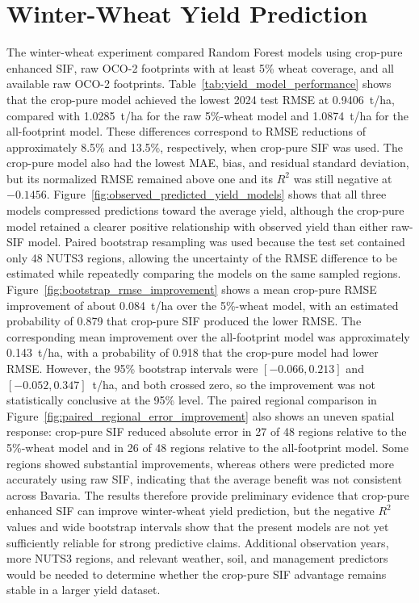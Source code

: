 \section{Winter-Wheat Yield Prediction}
The winter-wheat experiment compared Random Forest models using crop-pure enhanced SIF, raw OCO-2 footprints with at least 5\% wheat coverage, and all available raw OCO-2 footprints. Table~\ref{tab:yield_model_performance} shows that the crop-pure model achieved the lowest 2024 test RMSE at 0.9406~t/ha, compared with 1.0285~t/ha for the raw 5\%-wheat model and 1.0874~t/ha for the all-footprint model. These differences correspond to RMSE reductions of approximately 8.5\% and 13.5\%, respectively, when crop-pure SIF was used. The crop-pure model also had the lowest MAE, bias, and residual standard deviation, but its normalized RMSE remained above one and its $R^2$ was still negative at $-0.1456$. Figure~\ref{fig:observed_predicted_yield_models} shows that all three models compressed predictions toward the average yield, although the crop-pure model retained a clearer positive relationship with observed yield than either raw-SIF model. Paired bootstrap resampling was used because the test set contained only 48 NUTS3 regions, allowing the uncertainty of the RMSE difference to be estimated while repeatedly comparing the models on the same sampled regions. Figure~\ref{fig:bootstrap_rmse_improvement} shows a mean crop-pure RMSE improvement of about 0.084~t/ha over the 5\%-wheat model, with an estimated probability of 0.879 that crop-pure SIF produced the lower RMSE. The corresponding mean improvement over the all-footprint model was approximately 0.143~t/ha, with a probability of 0.918 that the crop-pure model had lower RMSE. However, the 95\% bootstrap intervals were $[-0.066,0.213]$ and $[-0.052,0.347]$~t/ha, and both crossed zero, so the improvement was not statistically conclusive at the 95\% level. The paired regional comparison in Figure~\ref{fig:paired_regional_error_improvement} also shows an uneven spatial response: crop-pure SIF reduced absolute error in 27 of 48 regions relative to the 5\%-wheat model and in 26 of 48 regions relative to the all-footprint model. Some regions showed substantial improvements, whereas others were predicted more accurately using raw SIF, indicating that the average benefit was not consistent across Bavaria. The results therefore provide preliminary evidence that crop-pure enhanced SIF can improve winter-wheat yield prediction, but the negative $R^2$ values and wide bootstrap intervals show that the present models are not yet sufficiently reliable for strong predictive claims. Additional observation years, more NUTS3 regions, and relevant weather, soil, and management predictors would be needed to determine whether the crop-pure SIF advantage remains stable in a larger yield dataset.

